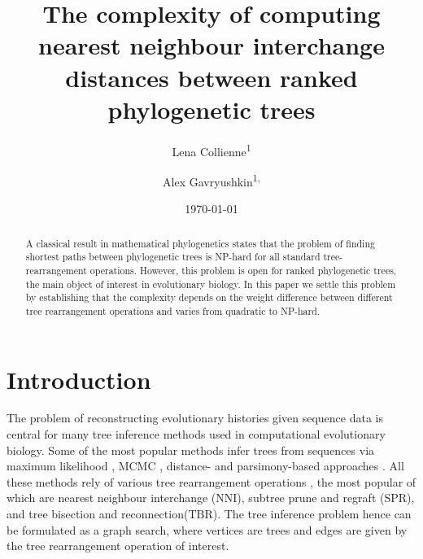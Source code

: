 \documentclass[11pt]{amsart}
\title[Computing $\rnni$ distance]{The complexity of computing nearest neighbour interchange distances between ranked phylogenetic trees}
\date{\today}
\author{Lena Collienne\textsuperscript{1}}
\author{Alex Gavryushkin\textsuperscript{1, \Letter}}
\newcommand{\nni}{\mathrm{NNI}}
\newcommand{\spr}{\mathrm{SPR}}
\newcommand{\tbr}{\mathrm{TBR}}
\newcommand{\summary}[1]{} %
\begin{document}
\begin{abstract}
A classical result in mathematical phylogenetics states that the problem of finding shortest paths between phylogenetic trees is NP-hard for all standard tree-rearrangement operations.
However, this problem is open for ranked phylogenetic trees, the main object of interest in evolutionary biology.
In this paper we settle this problem by establishing that the complexity depends on the weight difference between different tree rearrangement operations and varies from quadratic to NP-hard.
\end{abstract}


\maketitle
\thispagestyle{empty}

\newpage

\setcounter{page}{1}

\section{Introduction}

\summary{Motivation: many popular tree search algorithms are based on NNI (e.g. this \url{https://academic.oup.com/mbe/article/28/10/2731/973375} tool has been cited 40K+ times, see also references there to PhyML, RaxML, etc. -- they all use NNI); other applications include tree comparison methods, tree inference methods (proposal distributions), summary statistics, etc.}
The problem of reconstructing evolutionary histories given sequence data is central for many tree inference methods used in computational evolutionary biology.
Some of the most popular methods infer trees from sequences via maximum likelihood \autocite{Stamatakis2006-xb, Guindon2010-lo}, MCMC \autocite{Ronquist2003-eq, Suchard2018-tw, Bouckaert2018-yr}, distance- and parsimony-based approaches \autocite{Tamura2011-ky}.
All these methods rely of various tree rearrangement operations \autocite{Semple2003-nj}, the most popular of which are nearest neighbour interchange ($\nni$), subtree prune and regraft ($\spr$), and tree bisection and reconnection($\tbr$).
The tree inference problem hence can be formulated as a graph search, where vertices are trees and edges are given by the tree rearrangement operation of interest.
\end{document}
